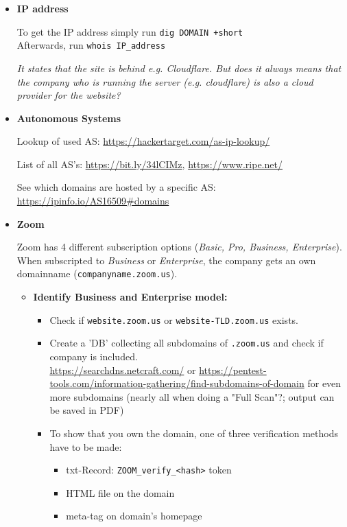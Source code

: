 \documentclass[12pt]{article}
\begin{document}
\begin{itemize}
    
    \item \textbf{IP address}
    
    To get the IP address simply run \verb|dig DOMAIN +short| \\
    Afterwards, run \verb|whois IP_address| 
    
    \textit{It states that the site is behind e.g. Cloudflare. But does it always means that the company who is running the server (e.g. cloudflare) is also a cloud provider for the website?}
   
    
    \item \textbf{Autonomous Systems}
    
    Lookup of used AS: \url{https://hackertarget.com/as-ip-lookup/}
    
    List of all AS's: \url{https://bit.ly/34lCIMz}, \url{https://www.ripe.net/}
    
    See which domains are hosted by a specific AS: \url{https://ipinfo.io/AS16509#domains}
    
    
    \item \textbf{Zoom}
        
    Zoom has 4 different subscription options (\textit{Basic, Pro, Business, Enterprise}). When subscripted to \textit{Business} or \textit{Enterprise}, the company gets an own domainname (\verb|companyname.zoom.us|).
    
    \begin{itemize}
        \item \textbf{Identify Business and Enterprise model:} 
        \begin{itemize}
            \item Check if \verb|website.zoom.us| or \verb|website-TLD.zoom.us| exists.
            \item Create a 'DB' collecting all subdomains of \verb|.zoom.us| and check if company is included.\\
            \url{https://searchdns.netcraft.com/} or \url{https://pentest-tools.com/information-gathering/find-subdomains-of-domain} for even more subdomains (nearly all when doing a "Full Scan"?; output can be saved in PDF)
            \item To show that you own the domain, one of three verification methods have to be made:
            \begin{itemize}
                \item txt-Record: \verb|ZOOM_verify_<hash>| token
                \item HTML file on the domain
                \item meta-tag on domain's homepage
            \end{itemize}
        \end{itemize}
    \end{itemize}
    

\end{itemize}
\end{document}
